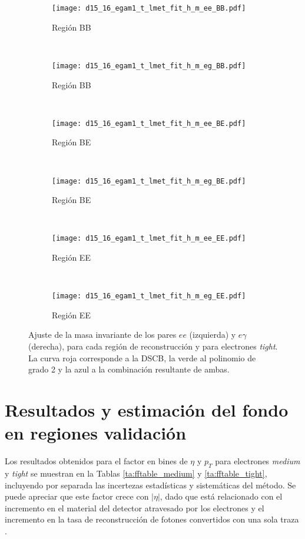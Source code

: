 \begin{figure}

	\begin{subfigure}{0.5\textwidth}
		\texttt{[image: d15\_16\_egam1\_t\_lmet\_fit\_h\_m\_ee\_BB.pdf]} 
		\caption{Región BB}
	\end{subfigure}
	~
	\begin{subfigure}{0.5\textwidth}
		\texttt{[image: d15\_16\_egam1\_t\_lmet\_fit\_h\_m\_eg\_BB.pdf]}
		\caption{Región BB}
	\end{subfigure}
	~
	\begin{subfigure}{0.5\textwidth}
		\texttt{[image: d15\_16\_egam1\_t\_lmet\_fit\_h\_m\_ee\_BE.pdf]} 
		\caption{Región BE}
	\end{subfigure}
	~
	\begin{subfigure}{0.5\textwidth}
		\texttt{[image: d15\_16\_egam1\_t\_lmet\_fit\_h\_m\_eg\_BE.pdf]}
		\caption{Región BE}
	\end{subfigure}
	~
	\begin{subfigure}{0.5\textwidth}
		\texttt{[image: d15\_16\_egam1\_t\_lmet\_fit\_h\_m\_ee\_EE.pdf]} 
		\caption{Región EE}
	\end{subfigure}
	~
	\begin{subfigure}{0.5\textwidth}
		\texttt{[image: d15\_16\_egam1\_t\_lmet\_fit\_h\_m\_eg\_EE.pdf]}
		\caption{Región EE}
	\end{subfigure}

	\caption{Ajuste de la masa invariante de los pares $ee$ (izquierda) y $e\gamma$ (derecha), para cada región de reconstrucción y para electrones \textit{tight}. La curva roja corresponde a la DSCB, la verde al polinomio de grado 2 y la azul a la combinación resultante de ambas.}
\label{fits_invmass_tight}
\end{figure}




\section{Resultados y estimación del fondo en regiones validación} \label{sec:resultados}


Los resultados obtenidos para el factor en bines de $\eta$ y $p_{T}$ para electrones \textit{medium} y \textit{tight} se muestran en la Tablas \ref{ta:fftable_medium} y \ref{ta:fftable_tight}, incluyendo por separada las incertezas estadísticas y sistemáticas del método. Se puede apreciar que este factor crece con $|\eta|$, dado que está relacionado con el incremento en el material del detector atravesado por los electrones y el incremento en la tasa de reconstrucción de fotones convertidos con una sola traza \cite{Alonso:2147473}.


